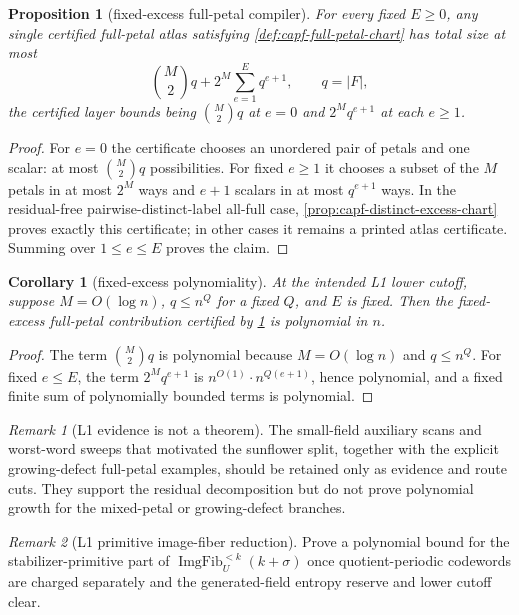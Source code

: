 \documentclass[11pt]{article}
\newtheorem{proposition}[proposition]{Proposition}
\newtheorem{corollary}[corollary]{Corollary}
\theoremstyle{definition}
\theoremstyle{remark}
\newtheorem{remark}[remark]{Remark}
\providecommand{\ImgFib}{\operatorname{ImgFib}}
\begin{document}
\begin{proposition}[fixed-excess full-petal compiler]\label{prop:capf-fixed-excess}
For every fixed $E\ge0$, any single certified full-petal atlas satisfying \cref{def:capf-full-petal-chart} has total size at most
\[
        \binom M2 q + 2^M\sum_{e=1}^{E}q^{e+1},
        \qquad q=|F| ,
\]
the certified layer bounds being $\binom M2q$ at $e=0$ and $2^Mq^{e+1}$ at each $e\ge1$.
\end{proposition}

\begin{proof}
For $e=0$ the certificate chooses an unordered pair of petals and one scalar: at most $\binom M2q$ possibilities.  For fixed $e\ge1$ it chooses a subset of the $M$ petals in at most $2^M$ ways and $e+1$ scalars in at most $q^{e+1}$ ways.  In the residual-free pairwise-distinct-label all-full case, \cref{prop:capf-distinct-excess-chart} proves exactly this certificate; in other cases it remains a printed atlas certificate.  Summing over $1\le e\le E$ proves the claim.
\end{proof}

\begin{corollary}[fixed-excess polynomiality]\label{cor:capf-fixed-excess-poly}
At the intended L1 lower cutoff, suppose $M=O(\log n)$, $q\le n^Q$ for a fixed $Q$, and $E$ is fixed.  Then the fixed-excess full-petal contribution certified by \cref{prop:capf-fixed-excess} is polynomial in $n$.
\end{corollary}

\begin{proof}
The term $\binom M2q$ is polynomial because $M=O(\log n)$ and $q\le n^Q$.  For fixed $e\le E$, the term $2^Mq^{e+1}$ is $n^{O(1)}\cdot n^{Q(e+1)}$, hence polynomial, and a fixed finite sum of polynomially bounded terms is polynomial.
\end{proof}

\begin{remark}[L1 evidence is not a theorem]\label{rem:capf-l1-evidence}
The small-field auxiliary scans and worst-word sweeps that motivated the sunflower split, together with the explicit growing-defect full-petal examples, should be retained only as evidence and route cuts.  They support the residual decomposition but do not prove polynomial growth for the mixed-petal or growing-defect branches.
\end{remark}

\begin{remark}[L1 primitive image-fiber reduction]\label{prob:capf-primitive-image-fiber}
Prove a polynomial bound for the stabilizer-primitive part of $\ImgFib_U^{<k}(k+\sigma)$ once quotient-periodic codewords are charged separately and the generated-field entropy reserve and lower cutoff clear.
\end{remark}
\end{document}
